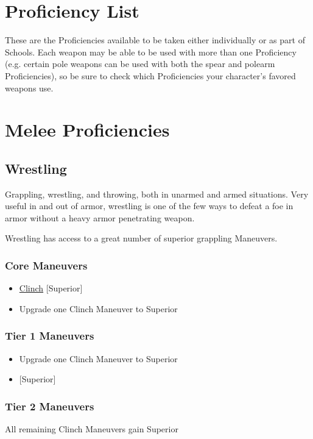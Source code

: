 \documentclass[oneside,11pt,english]{book}
\begin{document}
\section*{Proficiency List}
These are the Proficiencies available to be taken either individually or as part of Schools. Each weapon 
may be able to be used with more than one Proficiency (e.g. certain pole weapons can be used with both 
the spear and polearm Proficiencies), so be sure to check which Proficiencies your character’s favored weapons use.

\section{Melee Proficiencies}
\subsection{Wrestling} %
Grappling, wrestling, and throwing, both in unarmed and armed situations. Very
useful in and out of armor, wrestling is one of the few ways to defeat a foe in
armor without a heavy armor penetrating weapon.  

Wrestling has access to a great number of superior grappling Maneuvers. 

\subsubsection{Core Maneuvers}
\vspace{-5pt}\begin{itemize}
  [itemsep=0.5mm]
\item \hyperref[man:Clinch (Attack)]{Clinch} [Superior]
\item Upgrade one Clinch Maneuver to Superior
\end{itemize}
\subsubsection{Tier 1 Maneuvers}
\vspace{-5pt}\begin{itemize}
  [itemsep=0.5mm]
\item Upgrade one Clinch Maneuver to Superior
\item {} [Superior]
\end{itemize}
\subsubsection{Tier 2 Maneuvers}
All remaining Clinch Maneuvers gain Superior
\end{document}
